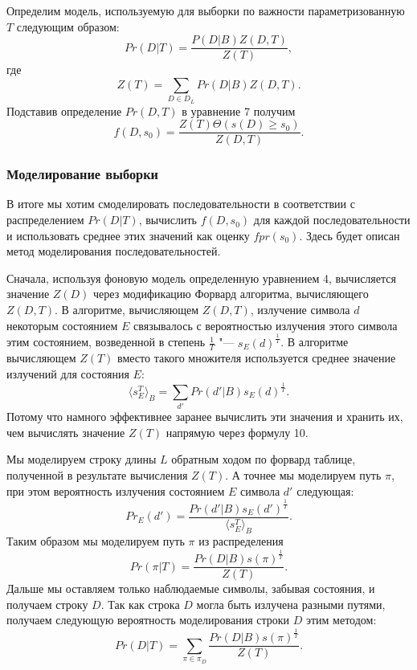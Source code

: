 \documentclass[specialist,
substylefile = spbu_report.rtx,
subf,href,colorlinks=true, 12pt]{disser}
\begin{document}
			Определим модель, используемую для выборки по важности параметризованную $T$ следующим образом:
			\begin{equation}
				Pr(D|T) = \frac{P(D|B)Z(D,T)}{Z(T)},
			\end{equation}							
			где 
			\begin{equation}
				Z(T) = \sum_{D \in D_{L}}Pr(D|B)Z(D,T).
			\end{equation}	
			Подставив определение $Pr(D,T)$ в уравнение 7 получим 
			\begin{equation}
				f(D,s_{0}) = \frac{Z(T)\Theta(s(D) \geq s_{0})}{Z(D,T)}.
			\end{equation}		
		
			\subsubsection{Моделирование выборки}
			В итоге мы хотим смоделировать последовательности в соответствии с распределением $Pr(D|T)$, вычислить $f(D, s_{0})$ для каждой последовательности и использовать среднее этих значений как оценку $fpr(s_{0})$. Здесь будет описан метод моделирования последовательностей.
			
			Сначала, используя фоновую модель определенную уравнением 4, вычисляется значение $Z(D)$ через модификацию Форвард алгоритма, вычисляющего $Z(D,T)$. В алгоритме, вычисляющем $Z(D,T)$, излучение символа $d$ некоторым состоянием $E$ связывалось с вероятностью излучения этого символа этим состоянием, возведенной в степень $\frac{1}{T}$ "--- $s_{E}(d)^{\frac{1}{T}}$. В алгоритме вычисляющем $Z(T)$ вместо такого множителя используется среднее значение излучений для состояния $E$:
			\begin{equation}
				\langle s_{E}^{T} \rangle_{B} = \sum_{d'}Pr(d'|B)s_{E}(d)^{\frac{1}{T}}.
			\end{equation}					
			Потому что намного эффективнее заранее вычислить эти значения и хранить их, чем вычислять значение $Z(T)$ напрямую через формулу 10.
			
			Мы моделируем строку длины $L$ обратным ходом по форвард таблице, полученной в результате вычисления $Z(T)$. А точнее мы моделируем путь $\pi$, при этом вероятность излучения состоянием $E$ символа $d'$ следующая:
			\begin{equation}
				Pr_{E}(d') = \frac{Pr(d'|B)s_{E}(d')^{\frac{1}{T}}} {\langle s_{E}^{T} \rangle_{B}}.
			\end{equation}			
			Таким образом мы моделируем путь $\pi$ из распределения 
			\begin{equation}
				Pr(\pi|T) = \frac{Pr(D|B)s(\pi)^{\frac{1}{T}}}{Z(T)}.
			\end{equation}
			Дальше мы оставляем только наблюдаемые символы, забывая состояния, и получаем строку $D$. Так как строка $D$ могла быть излучена разными путями, получаем следующую вероятность моделирования строки $D$ этим методом:
			\begin{equation}				
				Pr(D|T) = \sum_{\pi \in \pi_{D}} \frac{Pr(D|B)s(\pi)^{\frac{1}{T}}}{Z(T)}.
			\end{equation}	
			
\end{document}
